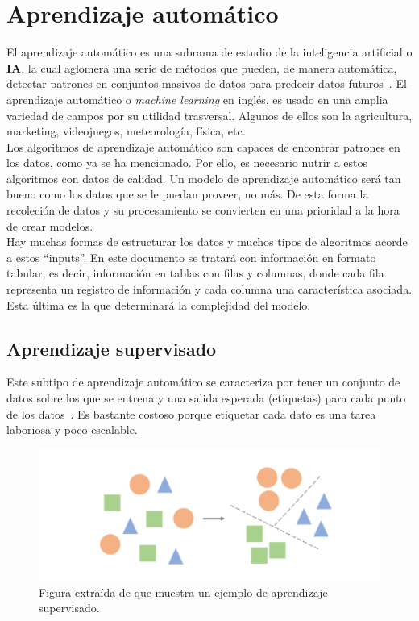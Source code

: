 \section{Aprendizaje automático}
El aprendizaje automático es una subrama de estudio de la inteligencia artificial o \textbf{IA}, la cual aglomera una serie de métodos que pueden, de manera automática, detectar patrones en conjuntos masivos de datos para predecir datos futuros~\cite{murphy2012machine}. El aprendizaje automático o \textit{machine learning} en inglés, es usado en una amplia variedad de campos por su utilidad trasversal. Algunos de ellos son la agricultura, marketing, videojuegos, meteorología, física, etc.\\[6pt]
Los algoritmos de aprendizaje automático son capaces de encontrar patrones en los datos, como ya se ha mencionado. Por ello, es necesario nutrir a estos algoritmos con datos de calidad. Un modelo de aprendizaje automático será tan bueno como los datos que se le puedan proveer, no más. De esta forma la recoleción de datos y su procesamiento se convierten en una prioridad a la hora de crear modelos.\\[6pt]
Hay muchas formas de estructurar los datos y muchos tipos de algoritmos acorde a estos ``inputs''. En este documento se tratará con información en formato tabular, es decir, información en tablas con filas y columnas, donde cada fila representa un registro de información y cada columna una característica asociada. Esta última es la que determinará la complejidad del modelo. 

\subsection{Aprendizaje supervisado}
Este subtipo de aprendizaje automático se caracteriza por tener un conjunto de datos sobre los que se entrena y una salida esperada (etiquetas) para cada punto de los datos~\cite{sah2020machine}. Es bastante costoso porque etiquetar cada dato es una tarea laboriosa y poco escalable.

\begin{figure}[H]
    \begin{center}
        \includegraphics[width=1\textwidth]{imagenes/ml-supervised-learning.png}
    \end{center}
    \caption[Aprendizaje supervisado]{Figura extraída de \cite{sah2020machine} que muestra un ejemplo de aprendizaje supervisado.}
\end{figure}

